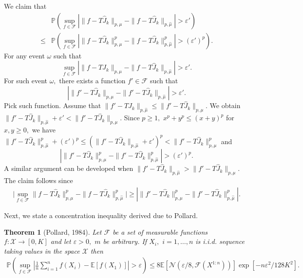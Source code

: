 \documentclass[12pt,technote,onecolumn]{IEEEtran}
\newtheorem{theorem}{Theorem}
\begin{document}
\begin{IEEEproof}
	We claim that
	\begin{equation*}
	\begin{aligned}
	&\mathbb{P}\left(\sup_{f\in\mathcal{F}}\left|\|f-T\widehat{J}_{k}\|_{p,\mu}-\|f-T\widehat{J}_{k}\|_{p,\hat{\mu}}\right|>\varepsilon'\right)\\
	\leq&\mathbb{P}\left(\sup_{f\in\mathcal{F}}\left|\|f-T\widehat{J}_{k}\|_{p,\mu}^{p}-\|f-T\widehat{J}_{k}\|_{p,\hat{\mu}}^{p}\right|>\left(\varepsilon'\right)^{p}\right).
	\end{aligned}
	\end{equation*}
	For any event $\omega$ such that
	\[
	\sup_{f\in\mathcal{F}}\left|\|f-T\widehat{J}_{k}\|_{p,\mu}-\|f-T\widehat{J}_{k}\|_{p,\hat{\mu}}\right|>\varepsilon'.
	\]
	For such event $\omega,$ there exists a function $f'\in\mathcal{F}$
	such that
	\[
	\left|\|f'-T\widehat{J}_{k}\|_{p,\mu}-\|f'-T\widehat{J}_{k}\|_{p,\hat{\mu}}\right|>\varepsilon'.
	\]
	Pick such function. Assume that $\|f'-T\widehat{J}_{k}\|_{p,\hat{\mu}}\leq\|f'-T\widehat{J}_{k}\|_{p,\mu}$.
	We obtain $\|f'-T\widehat{J}_{k}\|_{p,\hat{\mu}}+\varepsilon'<\|f'-T\widehat{J}_{k}\|_{p,\mu}.$
	Since $p\geq1,$ $x^{p}+y^{p}\leq\left(x+y\right)^{p}$ for $x,y\geq0,$
	we have $\|f'-T\widehat{J}_{k}\|_{p,\hat{\mu}}^{p}+\left(\varepsilon'\right)^{p}\leq(\|f'-T\widehat{J}_{k}\|_{p,\hat{\mu}}+\varepsilon')^{p}<\|f'-T\widehat{J}_{k}\|_{p,\mu}^{p}$
	and
	\[
	\left|\|f'-T\widehat{J}_{k}\|_{p,\mu}^{p}-\|f'-T\widehat{J}_{k}\|_{p,\hat{\mu}}^{p}\right|>\left(\varepsilon'\right)^{p}.
	\]
	A similar argument can be developed when $\|f'-T\widehat{J}_{k}\|_{p,\hat{\mu}}>\|f'-T\widehat{J}_{k}\|_{p,\mu}.$
	The claim follows since
	\begin{equation*}
	\begin{aligned}
	\bigg|\sup_{f\in\mathcal{F}}\|f-T\widehat{J}_{k}\|_{p,\mu}^{p}-\|f-T\widehat{J}_{k}\|_{p,\hat{\mu}}^{p}\bigg|
	\geq\left|\|f'-T\widehat{J}_{k}\|_{p,\mu}^{p}-\|f'-T\widehat{J}_{k}\|_{p,\hat{\mu}}^{p}\right|.
	\end{aligned}
	\end{equation*}
	
	Next, we state a concentration inequality derived due to Pollard.
	\begin{theorem}[Pollard, 1984]
		\label{thm:Pollard inequality} Let $\mathcal{F}$ be a set of measurable
		functions $f:\mathcal{X}\rightarrow\left[0,K\right]$ and let $\varepsilon>0,$
		$m$ be arbitrary. If $X_{i},$ $i=1,\dots,n$ is i.i.d. sequence taking
		values in the space $\mathcal{X}$ then
		\begin{equation*}
		\begin{aligned}
		\mathbb{P}\left(\sup_{f\in\mathcal{F}}\left|\frac{1}{n}\sum_{i=1}^{n}f\left(X_{i}\right)-\mathbb{E}\left[f\left(X_{1}\right)\right]\right|>\varepsilon\right)
		\leq8\mathbb{E}[\mathcal{N}(\varepsilon/8,\mathcal{F}(X^{1:n}))]\exp[-n\varepsilon^{2}/128K^{2}].
		\end{aligned}
		\end{equation*}
	\end{theorem}
	

\end{IEEEproof}
\end{document}
